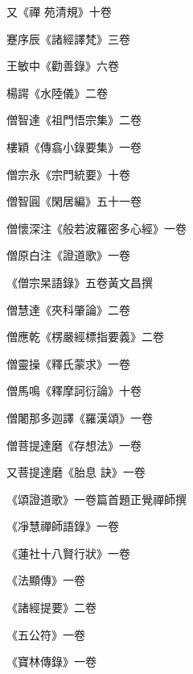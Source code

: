 \begin{pinyinscope}
 又《禪
 苑清規》十卷



 蹇序辰《諸經譯梵》三卷



 王敏中《勸善錄》六卷



 楊諤《水陸儀》二卷



 僧智達《祖門悟宗集》二卷



 樓穎《傳翕小錄要集》一卷



 僧宗永《宗門統要》十卷



 僧智圓《閑居編》五十一卷



 僧懷深注《般若波羅密多心經》一卷



 僧原白注《證道歌》一卷



 《僧宗杲語錄》五卷黃文昌撰



 僧慧達《夾科肇論》二卷



 僧應乾《楞嚴經標指要義》二卷



 僧靈操《釋氏蒙求》一卷



 僧馬鳴《釋摩訶衍論》十卷



 僧闍那多迦譯《羅漢頌》一卷



 僧菩提達磨《存想法》一卷



 又菩提達磨《胎息
 訣》一卷



 《頌證道歌》一卷篇首題正覺禪師撰



 《凈慧禪師語錄》一卷



 《蓮社十八賢行狀》一卷



 《法顯傳》一卷



 《諸經提要》二卷



 《五公符》一卷



 《寶林傳錄》一卷




\end{pinyinscope}
